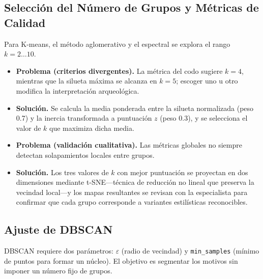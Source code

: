 \subsection{Selección del Número de Grupos y Métricas de Calidad}\label{ssec:k_selection}

Para K-means, el método aglomerativo y el espectral se explora el rango \(k=2\dots10\).

\begin{itemize}
  \item \textbf{Problema (criterios divergentes).}
        La métrica del codo sugiere \(k=4\), mientras que la silueta máxima se alcanza en \(k=5\); escoger uno u otro modifica la interpretación arqueológica.
  \item \textbf{Solución.}
        Se calcula la media ponderada entre la silueta normalizada (peso 0.7) y la inercia transformada a puntuación \(z\) (peso 0.3), y se selecciona el valor de \(k\) que maximiza dicha media.

  \item \textbf{Problema (validación cualitativa).}
        Las métricas globales no siempre detectan solapamientos locales entre grupos.
  \item \textbf{Solución.}
        Los tres valores de \(k\) con mejor puntuación se proyectan en dos dimensiones mediante t-SNE—técnica de reducción no lineal que preserva la vecindad local—y los mapas resultantes se revisan con la especialista para confirmar que cada grupo corresponde a variantes estilísticas reconocibles.
\end{itemize}

\subsection{Ajuste de DBSCAN}\label{ssec:dbscan}

DBSCAN requiere dos parámetros: \(\varepsilon\) (radio de vecindad) y \texttt{min\_samples} (mínimo de puntos para formar un núcleo).
El objetivo es segmentar los motivos sin imponer un número fijo de grupos.


